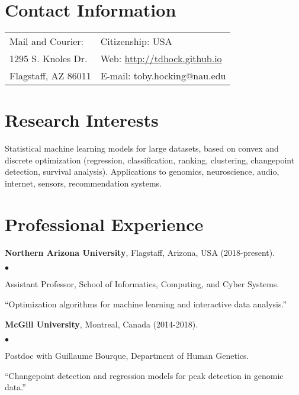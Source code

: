 \documentclass[margin,line]{res}
\newenvironment{list2}{
  \begin{list}{$\bullet$}{%
      \setlength{\itemsep}{0in}
      \setlength{\parsep}{0in} \setlength{\parskip}{0in}
      \setlength{\topsep}{0in} \setlength{\partopsep}{0in} 
      \setlength{\leftmargin}{0.2in}}}{\end{list}}
\begin{document}

\begin{resume}
\section{\sc Contact Information}
\vspace{.05in}
\begin{tabular*}{6.1in} {@{\extracolsep{\fill}}ll}
 Mail and Courier: & Citizenship: USA \\            
 1295 S. Knoles Dr.  & Web: \url{http://tdhock.github.io}\\     
Flagstaff, AZ 86011 & E-mail:  toby.hocking@nau.edu       \\
\end{tabular*}

\section{\sc Research Interests}

Statistical machine learning models for large
datasets, based on convex and discrete optimization (regression,
classification, ranking, clustering, changepoint detection, survival
analysis). Applications to genomics, neuroscience,
audio, internet, sensors, recommendation systems.


\section{\sc Professional Experience}

{\bf Northern Arizona University}, Flagstaff, Arizona, USA (2018-present).\\
\vspace*{-.1in}
\begin{list2}
\item[] Assistant Professor, School of Informatics, Computing, and Cyber Systems.
\item[] ``Optimization algorithms for machine learning and interactive data analysis.''
\end{list2}

{\bf McGill University}, Montreal, Canada (2014-2018).\\
\vspace*{-.1in}
\begin{list2}
\item[] Postdoc with Guillaume Bourque, Department of Human Genetics.
\item[]``Changepoint detection and regression models for peak detection in genomic data.''
\end{list2}


\end{resume}
\end{document}
